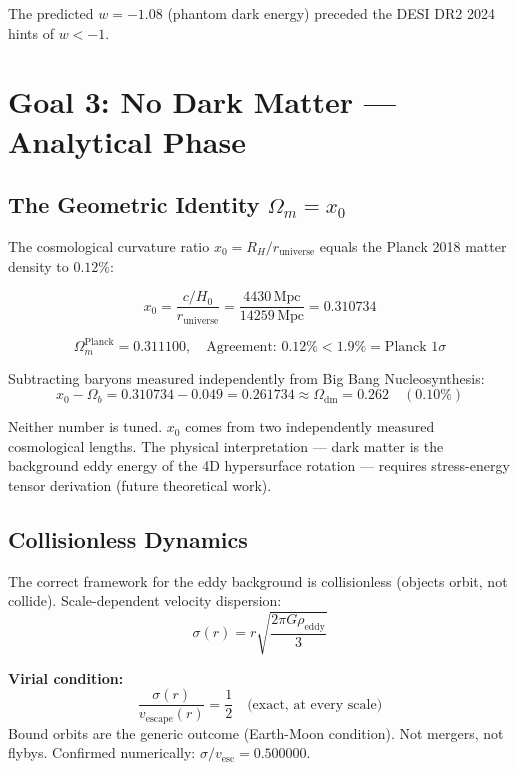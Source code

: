\documentclass[12pt]{article}
\begin{document}
The predicted $w = -1.08$ (phantom dark energy) preceded the DESI DR2 2024 hints of $w < -1$.

\section{Goal 3: No Dark Matter — Analytical Phase}

\subsection{The Geometric Identity $\Omega_m = x_0$}

The cosmological curvature ratio $x_0 = R_H/r_\text{universe}$ equals the Planck 2018
matter density to $0.12\%$:

\begin{equation}
x_0 = \frac{c/H_0}{r_\text{universe}} = \frac{4430\,\text{Mpc}}{14259\,\text{Mpc}} = 0.310734
\end{equation}

\begin{equation}
\Omega_m^\text{Planck} = 0.311100, \quad \text{Agreement: } 0.12\% < 1.9\% = \text{Planck } 1\sigma
\end{equation}

Subtracting baryons measured independently from Big Bang Nucleosynthesis:
\begin{equation}
x_0 - \Omega_b = 0.310734 - 0.049 = 0.261734 \approx \Omega_\text{dm} = 0.262 \quad (0.10\%)
\end{equation}

Neither number is tuned. $x_0$ comes from two independently measured cosmological lengths.
The physical interpretation --- dark matter is the background eddy energy of the
4D hypersurface rotation --- requires stress-energy tensor derivation (future theoretical work).

\subsection{Collisionless Dynamics}

The correct framework for the eddy background is collisionless (objects orbit, not collide).
Scale-dependent velocity dispersion:
\begin{equation}
\sigma(r) = r\sqrt{\frac{2\pi G\rho_\text{eddy}}{3}}
\end{equation}

\textbf{Virial condition:}
\begin{equation}
\frac{\sigma(r)}{v_\text{escape}(r)} = \frac{1}{2} \quad \text{(exact, at every scale)}
\end{equation}
Bound orbits are the generic outcome (Earth-Moon condition). Not mergers, not flybys.
Confirmed numerically: $\sigma/v_\text{esc} = 0.500000$.
\end{document}
